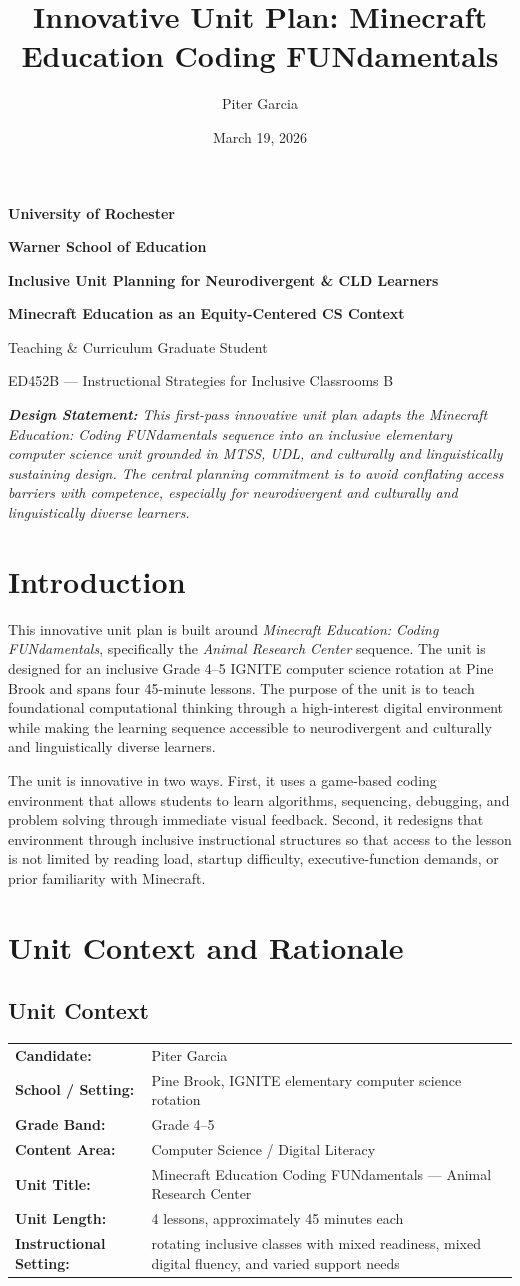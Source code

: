\documentclass[12pt]{article}
\title{Innovative Unit Plan: Minecraft Education Coding FUNdamentals}
\author{Piter Garcia}
\date{March 19, 2026}
\makeatletter
\renewcommand{\maketitle}{
\begin{titlepage}
\centering
\vspace*{0.65in}
{\Large\bfseries University of Rochester\par}
{\large\bfseries Warner School of Education\par}
\vspace{0.8in}
{\LARGE \@title \par}
\vspace{0.35in}
{\large \textcolor{NavyBlue}{\textbf{Inclusive Unit Planning for Neurodivergent \& CLD Learners}}\par}
{\large \textcolor{BrickRed}{\textbf{Minecraft Education as an Equity-Centered CS Context}}\par}
\vspace{0.8in}
{\large \textbf{\@author}\par}
{\large Teaching \& Curriculum Graduate Student\par}
\vspace{0.15in}
{\large \@date \par}
\vfill
{\large ED452B --- Instructional Strategies for Inclusive Classrooms B\par}
\vspace{1.4cm}
\noindent\textit{\tiny\textbf{Design Statement:} This first-pass innovative unit plan adapts the \emph{Minecraft Education: Coding FUNdamentals} sequence into an inclusive elementary computer science unit grounded in MTSS, UDL, and culturally and linguistically sustaining design. The central planning commitment is to avoid conflating access barriers with competence, especially for neurodivergent and culturally and linguistically diverse learners.}
\end{titlepage}
}
\makeatother
\begin{document}
\maketitle
\newpage

\tableofcontents
\newpage

\section{Introduction}

This innovative unit plan is built around \emph{Minecraft Education: Coding FUNdamentals}, specifically the \emph{Animal Research Center} sequence. The unit is designed for an inclusive Grade 4--5 IGNITE computer science rotation at Pine Brook and spans four 45-minute lessons. The purpose of the unit is to teach foundational computational thinking through a high-interest digital environment while making the learning sequence accessible to neurodivergent and culturally and linguistically diverse learners.

The unit is innovative in two ways. First, it uses a game-based coding environment that allows students to learn algorithms, sequencing, debugging, and problem solving through immediate visual feedback. Second, it redesigns that environment through inclusive instructional structures so that access to the lesson is not limited by reading load, startup difficulty, executive-function demands, or prior familiarity with Minecraft.

\section{Unit Context and Rationale}

\subsection{Unit Context}

\begin{tabular}{@{}P{2.1in}P{4.8in}@{}}
\textbf{Candidate:} & Piter Garcia \\
\textbf{School / Setting:} & Pine Brook, IGNITE elementary computer science rotation \\
\textbf{Grade Band:} & Grade 4--5 \\
\textbf{Content Area:} & Computer Science / Digital Literacy \\
\textbf{Unit Title:} & Minecraft Education Coding FUNdamentals --- Animal Research Center \\
\textbf{Unit Length:} & 4 lessons, approximately 45 minutes each \\
\textbf{Instructional Setting:} & rotating inclusive classes with mixed readiness, mixed digital fluency, and varied support needs \\
\end{tabular}
\end{document}
